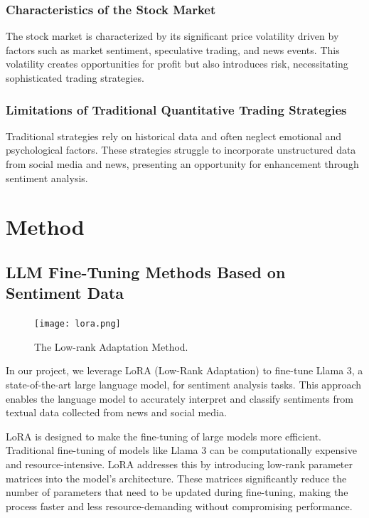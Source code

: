 \documentclass[conference]{IEEEtran}
\begin{document}
\subsubsection{\textbf{Characteristics of the Stock Market}}
The stock market is characterized by its significant price volatility driven by factors such as market sentiment, speculative trading, and news events. This volatility creates opportunities for profit but also introduces risk, necessitating sophisticated trading strategies.

\subsubsection{\textbf{Limitations of Traditional Quantitative Trading Strategies}}
Traditional strategies rely on historical data and often neglect emotional and psychological factors. These strategies struggle to incorporate unstructured data from social media and news, presenting an opportunity for enhancement through sentiment analysis.

\section{\textbf{Method}}
\subsection{\textbf{LLM Fine-Tuning Methods Based on Sentiment Data}}

\begin{figure}[h]
    \centering
    \texttt{[image: lora.png]}
    \caption{The Low-rank Adaptation Method.}
    \label{fig:lora}
\end{figure}

In our project, we leverage LoRA (Low-Rank Adaptation) to fine-tune Llama 3, a state-of-the-art large language model, for sentiment analysis tasks. This approach enables the language model to accurately interpret and classify sentiments from textual data collected from news and social media. 

LoRA is designed to make the fine-tuning of large models more efficient. Traditional fine-tuning of models like Llama 3 can be computationally expensive and resource-intensive. LoRA addresses this by introducing low-rank parameter matrices into the model's architecture. These matrices significantly reduce the number of parameters that need to be updated during fine-tuning, making the process faster and less resource-demanding without compromising performance.
\end{document}
